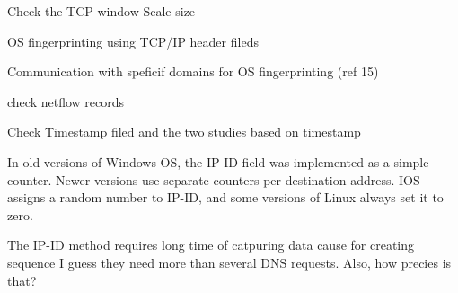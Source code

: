 Check the TCP window Scale size 

OS fingerprinting using TCP/IP header fileds 

Communication with speficif domains for OS fingerprinting (ref 15)

check netflow records 

Check Timestamp filed and the two studies based on timestamp

In old versions of Windows OS, the IP-ID field was
implemented as a simple counter. Newer versions use separate
counters per destination address. IOS assigns a random number
to IP-ID, and some versions of Linux always set it to zero.

The IP-ID method requires long time of catpuring data cause for creating sequence I guess they need more than several DNS requests. Also, how precies is that?

